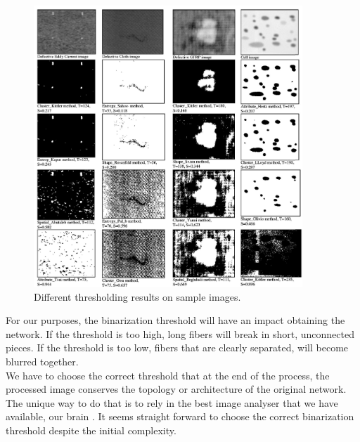 \begin{figure}[h]
\begin{center}
\includegraphics[width=0.9\textwidth,
height=0.6\textwidth]{Figures/fig_threshold_image.png}

\caption[Threshold calculation by different methods]{Different thresholding
results on sample images.\citep{sezgin_survey_2004}}
\label{fig:threshold}
\end{center}

\end{figure}

For our purposes, the binarization threshold will have an impact obtaining the
network. If the threshold is too high, long fibers will break in short,
unconnected pieces. If the threshold is too low, fibers that are clearly
separated, will become blurred together.\\
We have to choose the correct threshold that at the end of the process,
the processed image conserves the topology or architecture of the
original network. The unique way to do that is to rely in the best image
analyser that we have available, our brain . It seems straight forward to choose
the correct binarization threshold despite the initial complexity.
 
